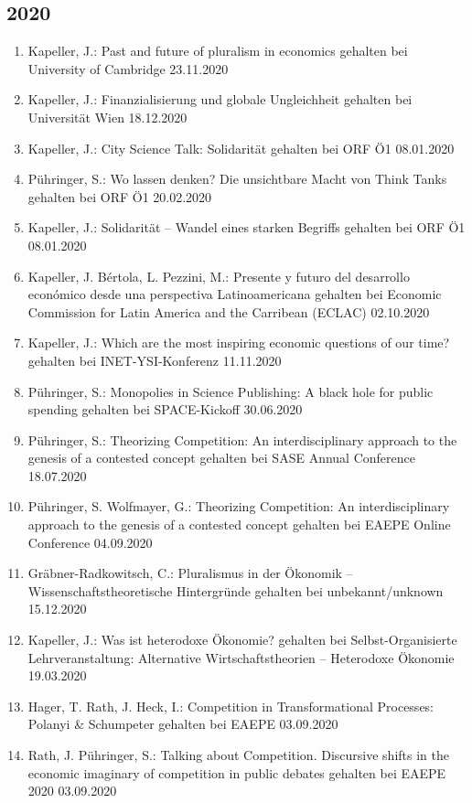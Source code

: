 \subsection*{2020}
\begin{enumerate}
	\item Kapeller, J.: Past and future of pluralism in economics gehalten bei University of Cambridge 23.11.2020
	\item Kapeller, J.: Finanzialisierung und globale Ungleichheit gehalten bei Universität Wien 18.12.2020
	\item Kapeller, J.: City Science Talk: Solidarität gehalten bei ORF Ö1 08.01.2020
	\item Pühringer, S.: Wo lassen denken? Die unsichtbare Macht von Think Tanks gehalten bei ORF Ö1 20.02.2020
	\item Kapeller, J.: Solidarität – Wandel eines starken Begriffs gehalten bei ORF Ö1 08.01.2020
	\item Kapeller, J. Bértola, L. Pezzini, M.: Presente y futuro del desarrollo económico desde una perspectiva Latinoamericana gehalten bei Economic Commission for Latin America and the Carribean (ECLAC) 02.10.2020
	\item Kapeller, J.: Which are the most inspiring economic questions of our time? gehalten bei INET-YSI-Konferenz 11.11.2020
	\item Pühringer, S.: Monopolies in Science Publishing: A black hole for public spending gehalten bei SPACE-Kickoff 30.06.2020
	\item Pühringer, S.: Theorizing Competition: An interdisciplinary approach to the genesis of a contested concept gehalten bei SASE Annual Conference 18.07.2020
	\item Pühringer, S. Wolfmayer, G.: Theorizing Competition: An interdisciplinary approach to the genesis of a contested concept gehalten bei EAEPE Online Conference 04.09.2020
	\item Gräbner-Radkowitsch, C.: Pluralismus in der Ökonomik -- Wissenschaftstheoretische Hintergründe gehalten bei unbekannt/unknown 15.12.2020
	\item Kapeller, J.: Was ist heterodoxe Ökonomie? gehalten bei Selbst-Organisierte Lehrveranstaltung: \glqq Alternative Wirtschaftstheorien -- Heterodoxe Ökonomie\grqq{} 19.03.2020
	\item Hager, T. Rath, J. Heck, I.: Competition in Transformational Processes: Polanyi \& Schumpeter gehalten bei EAEPE 03.09.2020
	\item Rath, J. Pühringer, S.: Talking about Competition. Discursive shifts in the economic imaginary of competition in public debates gehalten bei EAEPE 2020 03.09.2020

\end{enumerate}
